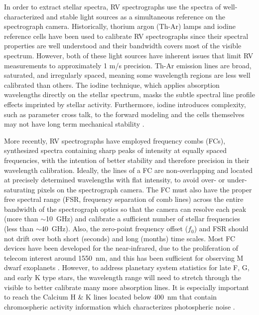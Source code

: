 \documentclass[11pt]{article}
\begin{document}
In order to extract stellar spectra, RV spectrographs use the spectra of well-characterized and stable light sources as a simultaneous reference on the spectrograph camera. Historically, thorium argon (Th-Ar) lamps and iodine reference cells have been used to calibrate RV spectrographs since their spectral properties are well understood and their bandwidth covers most of the visible spectrum. However, both of these light sources have inherent issues that limit RV measurements to approximately 1 m/s precision. Th-Ar emission lines are broad, saturated, and irregularly spaced, meaning some wavelength regions are less well calibrated than others. The iodine technique, which applies absorption wavelengths directly on the stellar spectrum, masks the subtle spectral line profile effects imprinted by stellar activity. Furthermore, iodine introduces complexity, such as parameter cross talk, to the forward modeling \citep{Spronck2015} and the cells themselves may not have long term mechanical stability \citep{Fischer2014a}.

More recently, RV spectrographs have employed frequency combs (FCs), synthesized spectra containing sharp peaks of intensity at equally spaced frequencies, with the intention of better stability and therefore precision in their wavelength calibration. Ideally, the lines of a FC are non-overlapping and located at precisely determined wavelengths with flat intensity, to avoid over- or under-saturating pixels on the spectrograph camera. The FC must also have the proper free spectral range (FSR, frequency separation of comb lines) across the entire bandwidth of the spectrograph optics so that the camera can resolve each peak (more than $\sim$\SI{10}{\giga\hertz}) and calibrate a sufficient number of stellar frequencies (less than $\sim$\SI{40}{\giga\hertz}). Also, the zero-point frequency offset ($f_0$) and FSR should not drift over both short (seconds) and long (months) time scales. Most FC devices have been developed for the near-infrared, due to the proliferation of telecom interest around \SI{1550}{\nano\meter}, and this has been sufficient for observing M dwarf exoplanets \citep{Fischer2016}. However, to address planetary system statistics for late F, G, and early K type stars, the wavelength range will need to stretch through the visible to better calibrate many more absorption lines. It is especially important to reach the Calcium H & K lines located below \SI{400}{\nano\meter} that contain chromospheric activity information which characterizes photospheric noise \citep{Isaacson2010, Lovis2011}.
\end{document}
